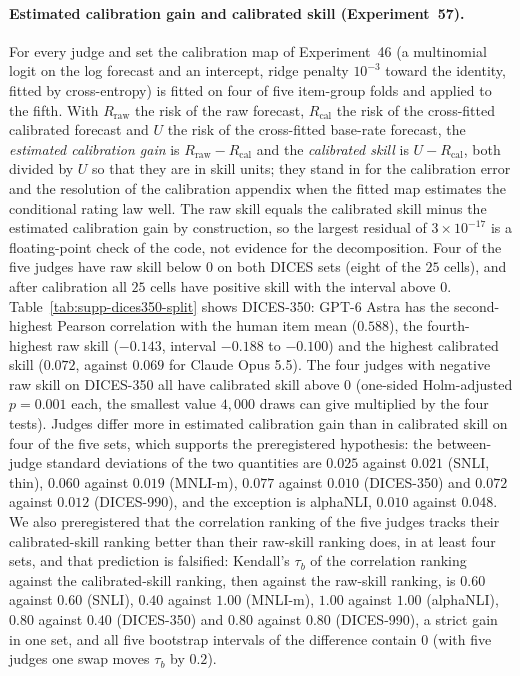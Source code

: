 \paragraph{Estimated calibration gain and calibrated skill (Experiment~57).}
For every judge and set the calibration map of Experiment~46 (a multinomial logit on the log forecast and an intercept, ridge penalty $10^{-3}$ toward the identity, fitted by cross-entropy) is fitted on four of five item-group folds and applied to the fifth.
With $R_{\text{raw}}$ the risk of the raw forecast, $R_{\text{cal}}$ the risk of the cross-fitted calibrated forecast and $U$ the risk of the cross-fitted base-rate forecast, the \emph{estimated calibration gain} is $R_{\text{raw}}-R_{\text{cal}}$ and the \emph{calibrated skill} is $U-R_{\text{cal}}$, both divided by $U$ so that they are in skill units; they stand in for the calibration error and the resolution of the calibration appendix when the fitted map estimates the conditional rating law well.
The raw skill equals the calibrated skill minus the estimated calibration gain by construction, so the largest residual of $3\times10^{-17}$ is a floating-point check of the code, not evidence for the decomposition.
Four of the five judges have raw skill below $0$ on both DICES sets (eight of the $25$ cells), and after calibration all $25$ cells have positive skill with the interval above $0$.
Table~\ref{tab:supp-dices350-split} shows DICES-350: GPT-6 Astra has the second-highest Pearson correlation with the human item mean ($0.588$), the fourth-highest raw skill ($-0.143$, interval $-0.188$ to $-0.100$) and the highest calibrated skill ($0.072$, against $0.069$ for Claude Opus 5.5).
The four judges with negative raw skill on DICES-350 all have calibrated skill above $0$ (one-sided Holm-adjusted $p=0.001$ each, the smallest value $4{,}000$ draws can give multiplied by the four tests).
Judges differ more in estimated calibration gain than in calibrated skill on four of the five sets, which supports the preregistered hypothesis: the between-judge standard deviations of the two quantities are $0.025$ against $0.021$ (SNLI, thin), $0.060$ against $0.019$ (MNLI-m), $0.077$ against $0.010$ (DICES-350) and $0.072$ against $0.012$ (DICES-990), and the exception is alphaNLI, $0.010$ against $0.048$.
We also preregistered that the correlation ranking of the five judges tracks their calibrated-skill ranking better than their raw-skill ranking does, in at least four sets, and that prediction is falsified: Kendall's $\tau_b$ of the correlation ranking against the calibrated-skill ranking, then against the raw-skill ranking, is $0.60$ against $0.60$ (SNLI), $0.40$ against $1.00$ (MNLI-m), $1.00$ against $1.00$ (alphaNLI), $0.80$ against $0.40$ (DICES-350) and $0.80$ against $0.80$ (DICES-990), a strict gain in one set, and all five bootstrap intervals of the difference contain $0$ (with five judges one swap moves $\tau_b$ by $0.2$).
